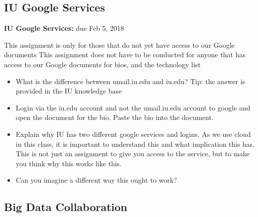 \subsection{IU Google Services}
\label{E:e616-iu-google-services}

\begin{exercise}\label{E:616-iu-google}

  {\bf IU Google Services:} due Feb 5, 2018
  
  This assignment is only for those that do
  not yet have access to our Google documents This assignment does not
  have to be conducted for anyone that has access to our Google
  documents for bios, and the technology list

  \begin{itemize}
 
  \item What is the difference between umail.iu.edu and iu.edu? Tip:
    the answer is provided in the IU knowledge base

  \item Login via the iu.edu account and not the umail.iu.edu account
    to google and open the document for the bio. Paste the bio into
    the document.

  \item Explain why IU has two different google services and
    logins. As we use cloud in this class, it is important to
    understand this and what implication this has. This is not just an
    assignment to give you access to the service, but to make you
    think why this works like this.

  \item Can you imagine a different way this ought to work?

  \end{itemize}

\end{exercise}

\subsection{Big Data Collaboration}
\label{E:616-bigdata-collab}

